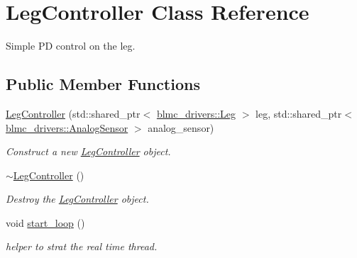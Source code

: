 \hypertarget{classLegController}{}\section{Leg\+Controller Class Reference}
\label{classLegController}


Simple PD control on the leg.  


\subsection*{Public Member Functions}
\begin{DoxyCompactItemize}
\item 
\hyperlink{classLegController_a9d1253c4c70fe6b83e449830c7328b58}{Leg\+Controller} (std\+::shared\+\_\+ptr$<$ \hyperlink{classblmc__drivers_1_1Leg}{blmc\+\_\+drivers\+::\+Leg} $>$ leg, std\+::shared\+\_\+ptr$<$ \hyperlink{classblmc__drivers_1_1AnalogSensor}{blmc\+\_\+drivers\+::\+Analog\+Sensor} $>$ analog\+\_\+sensor)
\begin{DoxyCompactList}\small\item\em Construct a new \hyperlink{classLegController}{Leg\+Controller} object. \end{DoxyCompactList}\item 
\hyperlink{classLegController_ad7f3068767ed754bbefd1744463764d0}{$\sim$\+Leg\+Controller} ()\hypertarget{classLegController_ad7f3068767ed754bbefd1744463764d0}{}\label{classLegController_ad7f3068767ed754bbefd1744463764d0}

\begin{DoxyCompactList}\small\item\em Destroy the \hyperlink{classLegController}{Leg\+Controller} object. \end{DoxyCompactList}\item 
void \hyperlink{classLegController_adacfe6a1709021da8cd7009672d01440}{start\+\_\+loop} ()\hypertarget{classLegController_adacfe6a1709021da8cd7009672d01440}{}\label{classLegController_adacfe6a1709021da8cd7009672d01440}

\begin{DoxyCompactList}\small\item\em helper to strat the real time thread. \end{DoxyCompactList}\end{DoxyCompactItemize}

